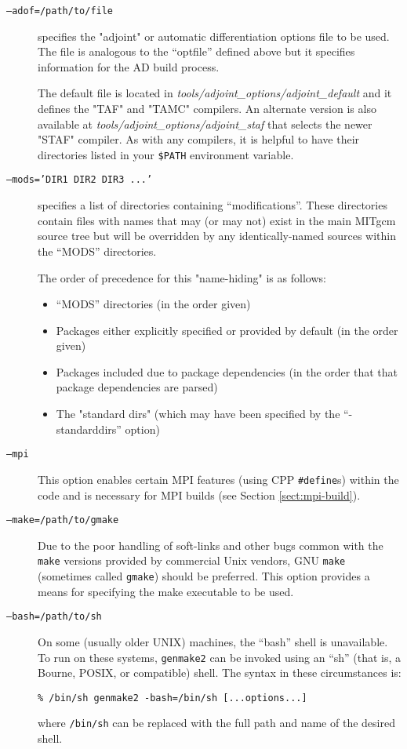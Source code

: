 \begin{description}
\item[\texttt{--adof=/path/to/file}] specifies the "adjoint" or
  automatic differentiation options file to be used.  The file is
  analogous to the ``optfile'' defined above but it specifies
  information for the AD build process.
  
  The default file is located in {\em
    tools/adjoint\_options/adjoint\_default} and it defines the "TAF"
  and "TAMC" compilers.  An alternate version is also available at
  {\em tools/adjoint\_options/adjoint\_staf} that selects the newer
  "STAF" compiler.  As with any compilers, it is helpful to have their
  directories listed in your {\tt \$PATH} environment variable.
  
\item[\texttt{--mods='DIR1 DIR2 DIR3 ...'}] specifies a list of
  directories containing ``modifications''.  These directories contain
  files with names that may (or may not) exist in the main MITgcm
  source tree but will be overridden by any identically-named sources
  within the ``MODS'' directories.
  
  The order of precedence for this "name-hiding" is as follows:
  \begin{itemize}
  \item ``MODS'' directories (in the order given)
  \item Packages either explicitly specified or provided by default
    (in the order given)
  \item Packages included due to package dependencies (in the order
    that that package dependencies are parsed)
  \item The "standard dirs" (which may have been specified by the
    ``-standarddirs'' option)
  \end{itemize}
  
\item[\texttt{--mpi}] This option enables certain MPI features (using
  CPP \texttt{\#define}s) within the code and is necessary for MPI
  builds (see Section \ref{sect:mpi-build}).
  
\item[\texttt{--make=/path/to/gmake}] Due to the poor handling of
  soft-links and other bugs common with the \texttt{make} versions
  provided by commercial Unix vendors, GNU \texttt{make} (sometimes
  called \texttt{gmake}) should be preferred.  This option provides a
  means for specifying the make executable to be used.
  
\item[\texttt{--bash=/path/to/sh}] On some (usually older UNIX)
  machines, the ``bash'' shell is unavailable.  To run on these
  systems, \texttt{genmake2} can be invoked using an ``sh'' (that is,
  a Bourne, POSIX, or compatible) shell.  The syntax in these
  circumstances is:
  \begin{center}
    \texttt{\%  /bin/sh genmake2 -bash=/bin/sh [...options...]}
  \end{center}
  where \texttt{/bin/sh} can be replaced with the full path and name
  of the desired shell.

\end{description}


